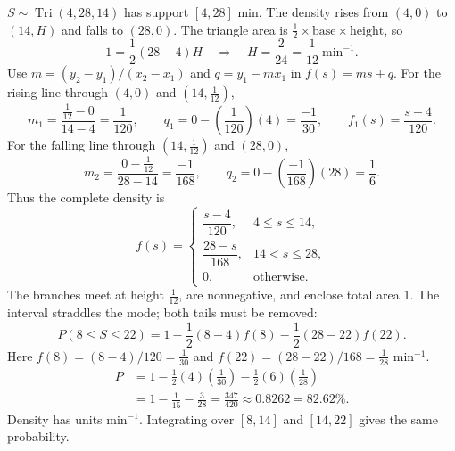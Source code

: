 $S\sim\operatorname{Tri}(4,28,14)$ has support $[4,28]$ min. The density rises from $(4,0)$ to $(14,H)$ and falls to $(28,0)$.
The triangle area is $\tfrac12\times\text{base}\times\text{height}$, so
\[1=\frac12(28-4)H\quad\Longrightarrow\quad H=\frac2{24}=\frac{1}{12}\ \mathrm{min}^{-1}.\]
Use $m=(y_2-y_1)/(x_2-x_1)$ and $q=y_1-mx_1$ in $f(s)=ms+q$.
For the rising line through $(4,0)$ and $(14,\frac{1}{12})$,
\[m_1=\frac{\frac{1}{12}-0}{14-4}=\frac{1}{120},\qquad q_1=0-(\frac{1}{120})(4)=\frac{-1}{30},\qquad f_1(s)=\frac{s-4}{120}.\]
For the falling line through $(14,\frac{1}{12})$ and $(28,0)$,
\[m_2=\frac{0-\frac{1}{12}}{28-14}=\frac{-1}{168},\qquad q_2=0-(\frac{-1}{168})(28)=\frac{1}{6}.\]
Thus the complete density is
\[f(s)=\begin{cases}\dfrac{s-4}{120},&4\le s\le14,\\[1mm]\dfrac{28-s}{168},&14<s\le28,\\[1mm]0,&\text{otherwise}.\end{cases}\]
The branches meet at height $\frac{1}{12}$, are nonnegative, and enclose total area 1.
\Needspace{10cm}
The interval straddles the mode; both tails must be removed:
\[P(8\le S\le22)=1-\frac12(8-4)f(8)-\frac12(28-22)f(22).\]
Here $f(8)=(8-4)/120=\frac{1}{30}$ and $f(22)=(28-22)/168=\frac{1}{28}$ min$^{-1}$.
\[\begin{aligned}P&=1-\tfrac12(4)(\frac{1}{30})-\tfrac12(6)(\frac{1}{28})\\
&=1-\frac{1}{15}-\frac{3}{28}=\boxed{\frac{347}{420}\approx0.8262=82.62\%}.\end{aligned}\]
Density has units min$^{-1}$. Integrating over $[8,14]$ and $[14,22]$ gives the same probability.

